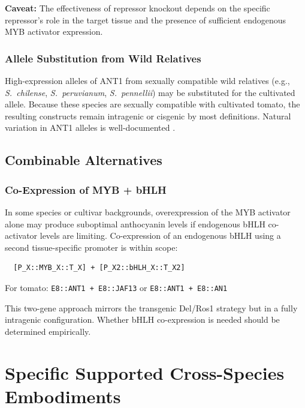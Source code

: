 \documentclass[12pt,a4paper]{article}
\begin{document}
\textbf{Caveat:} The effectiveness of repressor knockout depends on the specific repressor's role in the target tissue and the presence of sufficient endogenous MYB activator expression.

\subsubsection{Allele Substitution from Wild Relatives}

High-expression alleles of ANT1 from sexually compatible wild relatives (e.g., \textit{S.~chilense}, \textit{S.~peruvianum}, \textit{S.~pennellii}) may be substituted for the cultivated allele. Because these species are sexually compatible with cultivated tomato, the resulting constructs remain intragenic or cisgenic by most definitions. Natural variation in ANT1 alleles is well-documented \citep{Sapir2008}.

\subsection{Combinable Alternatives}

\subsubsection{Co-Expression of MYB + bHLH}

In some species or cultivar backgrounds, overexpression of the MYB activator alone may produce suboptimal anthocyanin levels if endogenous bHLH co-activator levels are limiting. Co-expression of an endogenous bHLH using a second tissue-specific promoter is within scope:

\begin{verbatim}
  [P_X::MYB_X::T_X] + [P_X2::bHLH_X::T_X2]
\end{verbatim}

For tomato: \texttt{E8::ANT1 + E8::JAF13} or \texttt{E8::ANT1 + E8::AN1}

This two-gene approach mirrors the transgenic Del/Ros1 strategy but in a fully intragenic configuration. Whether bHLH co-expression is needed should be determined empirically.

\section{Specific Supported Cross-Species Embodiments}
\label{sec:crossspecies}
\end{document}
